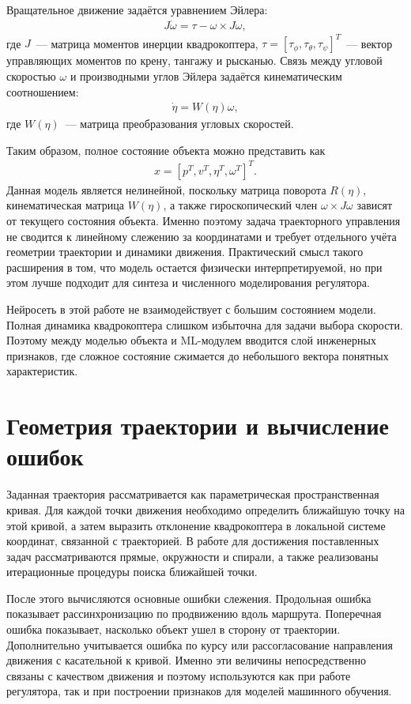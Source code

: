 Вращательное движение задаётся уравнением Эйлера:
\begin{gather}
    J\dot \omega = \tau - \omega \times J\omega,
\end{gather}
где $J$~--- матрица моментов инерции квадрокоптера,
$\tau = [\tau_\phi,\tau_\theta,\tau_\psi]^T$~--- вектор управляющих моментов
по крену, тангажу и рысканью. Связь между угловой скоростью $\omega$
и производными углов Эйлера задаётся кинематическим соотношением:
\begin{gather}
    \dot \eta = W(\eta)\omega,
\end{gather}
где $W(\eta)$~--- матрица преобразования угловых скоростей.

Таким образом, полное состояние объекта можно представить как
\begin{gather}
    x = [p^T, v^T, \eta^T, \omega^T]^T.
\end{gather}
Данная модель является нелинейной, поскольку матрица поворота $R(\eta)$,
кинематическая матрица $W(\eta)$, а также гироскопический член
$\omega \times J\omega$ зависят от текущего состояния объекта.
Именно поэтому задача траекторного управления не сводится к линейному слежению за координатами и требует отдельного учёта геометрии траектории и динамики движения.
Практический смысл такого расширения в том, что модель остается физически интерпретируемой, но при этом лучше подходит для синтеза и численного моделирования регулятора.

Нейросеть в этой работе не взаимодействует с большим состоянием модели.
Полная динамика квадрокоптера слишком избыточна для задачи выбора скорости.
Поэтому между моделью объекта и ML-модулем вводится слой инженерных признаков, где сложное состояние сжимается до небольшого вектора понятных характеристик.


\section{Геометрия траектории и вычисление ошибок}

Заданная траектория рассматривается как параметрическая пространственная кривая.
Для каждой точки движения необходимо определить ближайшую точку на этой кривой, а затем выразить отклонение квадрокоптера в локальной системе координат, связанной с траекторией.
В работе для достижения поставленных задач рассматриваются прямые, окружности и спирали, а также реализованы итерационные процедуры поиска ближайшей точки.

После этого вычисляются основные ошибки слежения.
Продольная ошибка показывает рассинхронизацию по продвижению вдоль маршрута.
Поперечная ошибка показывает, насколько объект ушел в сторону от траектории.
Дополнительно учитывается ошибка по курсу или рассогласование направления движения с касательной к кривой.
Именно эти величины непосредственно связаны с качеством движения и поэтому используются как при работе регулятора, так и при построении признаков для моделей машинного обучения.


